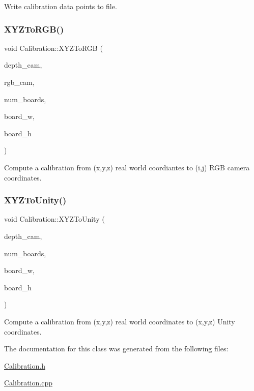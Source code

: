 Write calibration data points to file. 

\hypertarget{class_calibration_ae686271805ffbaa32e0d8b796ae8d466}{}\label{class_calibration_ae686271805ffbaa32e0d8b796ae8d466} 
\subsubsection{\texorpdfstring{X\+Y\+Z\+To\+R\+G\+B()}{XYZToRGB()}}
{\footnotesize\ttfamily void Calibration\+::\+X\+Y\+Z\+To\+R\+GB (\begin{DoxyParamCaption}\item[{\hyperlink{class_depth_camera}{Depth\+Camera} $\ast$}]{depth\+\_\+cam,  }\item[{\hyperlink{class_r_g_b_camera}{R\+G\+B\+Camera} $\ast$}]{rgb\+\_\+cam,  }\item[{int}]{num\+\_\+boards,  }\item[{int}]{board\+\_\+w,  }\item[{int}]{board\+\_\+h }\end{DoxyParamCaption})\hspace{0.3cm}{\ttfamily [static]}}



Compute a calibration from (x,y,z) real world coordiantes to (i,j) R\+GB camera coordinates. 

\hypertarget{class_calibration_a81cb3c8c004042bfd86b6f973b607f67}{}\label{class_calibration_a81cb3c8c004042bfd86b6f973b607f67} 
\subsubsection{\texorpdfstring{X\+Y\+Z\+To\+Unity()}{XYZToUnity()}}
{\footnotesize\ttfamily void Calibration\+::\+X\+Y\+Z\+To\+Unity (\begin{DoxyParamCaption}\item[{\hyperlink{class_depth_camera}{Depth\+Camera} \&}]{depth\+\_\+cam,  }\item[{int}]{num\+\_\+boards,  }\item[{int}]{board\+\_\+w,  }\item[{int}]{board\+\_\+h }\end{DoxyParamCaption})\hspace{0.3cm}{\ttfamily [static]}}



Compute a calibration from (x,y,z) real world coordinates to (x\textquotesingle{},y\textquotesingle{},z\textquotesingle{}) Unity coordinates. 



The documentation for this class was generated from the following files\+:\begin{DoxyCompactItemize}
\item 
\hyperlink{_calibration_8h}{Calibration.\+h}\item 
\hyperlink{_calibration_8cpp}{Calibration.\+cpp}\end{DoxyCompactItemize}
